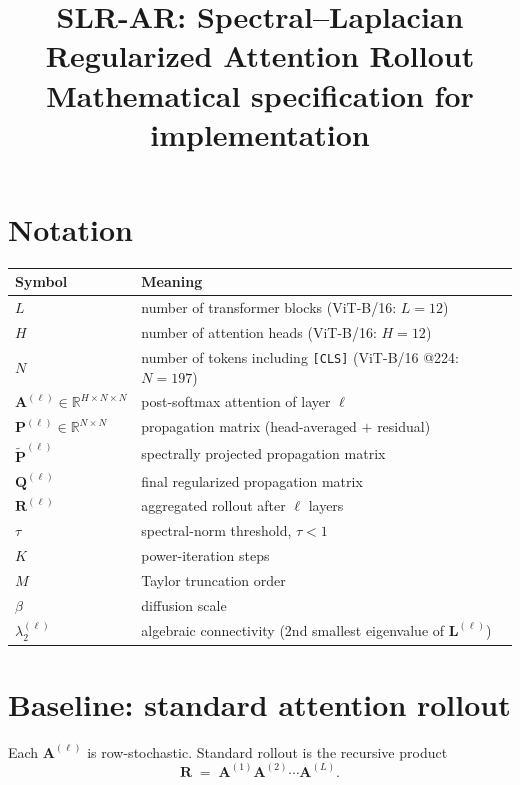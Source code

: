 \documentclass[11pt]{article}
\title{\textbf{SLR-AR: Spectral--Laplacian Regularized Attention Rollout}\\
       \large Mathematical specification for implementation}
\date{}
\newcommand{\A}{\mathbf{A}}
\newcommand{\Lap}{\mathbf{L}}
\newcommand{\Pm}{\mathbf{P}}
\newcommand{\Pt}{\tilde{\mathbf{P}}}
\newcommand{\Q}{\mathbf{Q}}
\newcommand{\R}{\mathbf{R}}
\newcommand{\Rb}{\mathbb{R}}
\begin{document}
\maketitle
\vspace{-2.2em}

\section{Notation}

\begin{center}
\begin{tabular}{ll}
\toprule
Symbol & Meaning \\
\midrule
$L$ & number of transformer blocks (ViT-B/16: $L=12$) \\
$H$ & number of attention heads (ViT-B/16: $H=12$) \\
$N$ & number of tokens including \texttt{[CLS]} (ViT-B/16 @224: $N=197$) \\
$\A^{(\ell)}\in\Rb^{H\times N\times N}$ & post-softmax attention of layer $\ell$ \\
$\Pm^{(\ell)}\in\Rb^{N\times N}$ & propagation matrix (head-averaged $+$ residual) \\
$\Pt^{(\ell)}$ & spectrally projected propagation matrix \\
$\Q^{(\ell)}$ & final regularized propagation matrix \\
$\R^{(\ell)}$ & aggregated rollout after $\ell$ layers \\
$\tau$ & spectral-norm threshold, $\tau<1$ \\
$K$ & power-iteration steps \\
$M$ & Taylor truncation order \\
$\beta$ & diffusion scale \\
$\lambda_2^{(\ell)}$ & algebraic connectivity (2nd smallest eigenvalue of $\Lap^{(\ell)}$) \\
\bottomrule
\end{tabular}
\end{center}

\section{Baseline: standard attention rollout}

Each $\A^{(\ell)}$ is row-stochastic. Standard rollout is the recursive product
\begin{equation}
\R \;=\; \A^{(1)}\A^{(2)}\cdots\A^{(L)} .
\end{equation}
\end{document}

